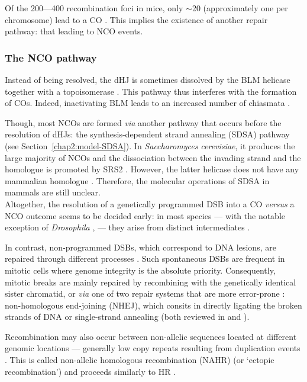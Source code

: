Of the 200—400 recombination foci in mice, only $\sim$20 (approximately one per chromosome) lead to a CO \citep{baudat2007regulating}.
This implies the existence of another repair pathway: that leading to NCO events.


\subsubsection{The NCO pathway}
Instead of being resolved, the dHJ is sometimes dissolved by the BLM helicase together with a topoisomerase \citep{wu2003bloom}. 
This pathway thus interferes with the formation of COs. Indeed, inactivating BLM leads to an increased number of chiasmata \citep{holloway2010mammalian}.

Though, most NCOs are formed \textit{via} another pathway that occurs before the resolution of dHJs: the synthesis-dependent strand annealing (SDSA) pathway (see Section~\ref{chap2:model-SDSA}).
In \textit{Saccharomyces cerevisiae}, it produces the large majority of NCOs \citep{martini2011genomewide} and the dissociation between the invading strand and the homologue is promoted by SRS2 \citep{ira2003srs2}.
However, the latter helicase does not have any mammalian homologue \citep{spell2004examination}. Therefore, the molecular operations of SDSA in mammals are still unclear.\\


Altogether, the resolution of a genetically programmed DSB into a CO \textit{versus} a NCO outcome seems to be decided early: in most species — with the notable exception of \textit{Drosophila} \citep{crown2014eliminating}, — they arise from distinct intermediates \citep[reviewed in][]{hunter2015meiotic}.

In contrast, non-programmed DSBs, which correspond to DNA lesions, are repaired through different processes \citep[reviewed in][]{sung2006mechanism}.
Such spontaneous DSBs are frequent in mitotic cells where genome integrity is the absolute priority.
Consequently, mitotic breaks are mainly repaired by recombining with the genetically identical sister chromatid, or \textit{via} one of two repair systems that are more error-prone \citep{smith2001influence}: non-homologous end-joining (NHEJ), which consits in directly ligating the broken strands of DNA \citep{weterings2004mechanism} or single-strand annealing (both reviewed in \citealp{helleday2003pathways} and \citealp{moynahan2010mitotic}).

Recombination may also occur between non-allelic sequences located at different genomic locations — generally low copy repeats resulting from duplication events \citep{bailey2006primate}. 
This is called non-allelic homologous recombination (NAHR) (or ‘ectopic recombination’) and proceeds similarly to HR \citep{sasaki2010genome}.



